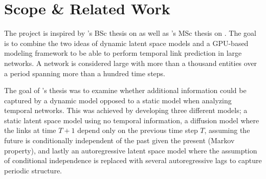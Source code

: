     
    

\section{Scope \& Related Work}

    The project is inspired by \citeauthor{zangenberg2018a}'s BSc thesis \cite{zangenberg2018a} on  as well as \citeauthor{jacobsen2018a}'s MSc thesis \cite{jacobsen2018a} on . 
    The goal is to combine the two ideas of dynamic latent space models and a GPU-based modeling framework to be able to perform temporal link prediction in large networks. A network is considered large with more than a thousand entities over a period spanning more than a hundred time steps.

    The goal of \citeauthor{zangenberg2018a}'s thesis was to examine whether additional information could be captured by a dynamic model opposed to a static model when analyzing temporal networks. This was achieved by developing three different models; a static latent space model using no temporal information, a diffusion model where the links at time $T+1$ depend only on the previous time step $T$, assuming the future is conditionally independent of the past given the present (Markov property), and lastly an autoregressive latent space model where the assumption of conditional independence is replaced with several autoregressive lags to capture periodic structure.
    
